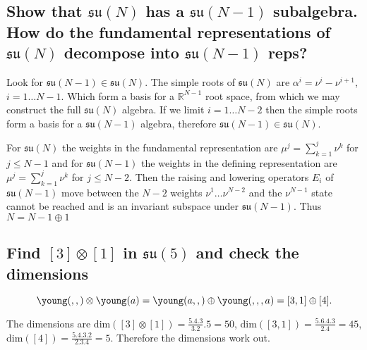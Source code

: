 \documentclass[main.tex]{subfiles}
\begin{document}
\subsection{Show that $\mathfrak{su}(N)$ has a $\mathfrak{su}(N-1)$ subalgebra. How do the fundamental representations of $\mathfrak{su}(N)$ decompose into $\mathfrak{su}(N-1)$ reps?}
Look for $\mathfrak{su}(N-1)\in\mathfrak{su}(N)$. The simple roots of $\mathfrak{su}(N)$ are $\alpha^i=\nu^i-\nu^{i+1}$, $i=1\dots N-1$. Which form a basis for a $\mathbb{R}^{N-1}$ root space, from which we may construct the full $\mathfrak{su}(N)$ algebra. If we limit $i=1 \dots N-2$ then the simple roots form a basis for a $\mathfrak{su}(N-1)$ algebra, therefore $\mathfrak{su}(N-1)\in\mathfrak{su}(N)$.

For $\mathfrak{su}(N)$ the weights in the fundamental representation are $\mu^j=\sum_{k=1}^{j}{\nu^k}$ for $j\leq N-1$ and for $\mathfrak{su}(N-1)$ the weights in the defining representation are $\mu^j=\sum_{k=1}^{j}{\nu^k}$ for $j\leq N-2$. Then the raising and lowering operators $E_i$ of $\mathfrak{su}(N-1)$ move between the $N-2$ weights $\nu^1\dots\nu^{N-2}$ and the $\nu^{N-1}$ state cannot be reached and is an invariant subspace under $\mathfrak{su}(N-1)$. Thus $N=N-1\oplus1$

\subsection{Find $[3]\otimes[1]$ in $\mathfrak{su}(5)$ and check the dimensions}

\begin{equation}
\young(\hfil,\hfil,\hfil)\otimes\young(a)=\young(\hfil a,\hfil,\hfil)\oplus \young(\hfil,\hfil,\hfil,a)=[3,1]\oplus[4].
\end{equation}

The dimensions are 
dim$([3]\otimes[1])=\frac{5.4.3}{3.2}.5=50$, dim$([3,1])=\frac{5.6.4.3}{2.4}=45$, dim$([4])=\frac{5.4.3.2}{2.3.4}=5$. Therefore the dimensions work out.
\end{document}
